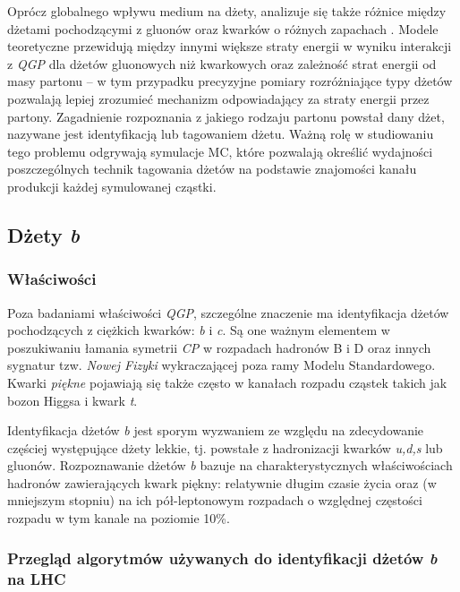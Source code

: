 Oprócz globalnego wpływu medium na dżety, analizuje się także różnice między dżetami pochodzącymi z gluonów oraz kwarków o różnych zapachach . Modele teoretyczne przewidują między innymi większe straty energii w wyniku interakcji z \textit{QGP} dla dżetów gluonowych niż kwarkowych \cite{Salgado:2003gb} oraz zależność strat energii od masy partonu \cite{Dokshitzer:2001zm} -- w tym przypadku precyzyjne pomiary rozróżniające typy dżetów pozwalają lepiej zrozumieć mechanizm odpowiadający za straty energii przez partony. Zagadnienie rozpoznania z jakiego rodzaju partonu powstał dany dżet, nazywane jest identyfikacją lub tagowaniem dżetu.
Ważną rolę w studiowaniu tego problemu odgrywają symulacje MC, które pozwalają określić wydajności poszczególnych technik tagowania dżetów na podstawie znajomości kanału produkcji każdej symulowanej cząstki.

\subsection{Dżety \textit{b}}
\label{subsec:b-dzety}

\subsubsection{Właściwości}
Poza badaniami właściwości \textit{QGP}, szczególne znaczenie ma identyfikacja dżetów pochodzących z ciężkich kwarków: \textit{b} i \textit{c}.
Są one ważnym elementem w poszukiwaniu łamania symetrii \textit{CP} w rozpadach hadronów B i D oraz innych sygnatur tzw. \textit{Nowej Fizyki} wykraczającej poza ramy Modelu Standardowego. 
Kwarki \textit{piękne} pojawiają się także często w kanałach rozpadu cząstek takich jak bozon Higgsa i kwark \textit{t}.

Identyfikacja dżetów \textit{b} jest sporym wyzwaniem ze względu na zdecydowanie częściej występujące dżety lekkie, tj. powstałe z hadronizacji kwarków \textit{u,d,s} lub gluonów.
Rozpoznawanie dżetów \textit{b} bazuje na charakterystycznych właściwościach hadronów zawierających kwark piękny: relatywnie długim czasie życia oraz (w mniejszym stopniu) na ich pół-leptonowym rozpadach o względnej częstości rozpadu w tym kanale  na poziomie 10\%.

\subsubsection{Przegląd algorytmów używanych do identyfikacji dżetów \textit{b} na LHC} 

